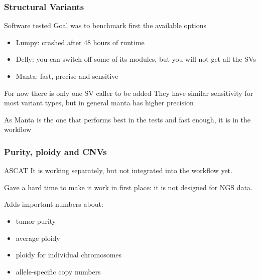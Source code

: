 \documentclass{beamer}
\begin{document}
\begin{frame}
\frametitle{Structural Variants}
	\begin{block}{Software tested}
	Goal was to benchmark first the available options
	\end{block}
	\begin{itemize}		
		\item Lumpy: crashed after 48 hours of runtime 
		\item Delly: you can switch off some of its modules, but you will not get all the SVs
		\item Manta: fast, precise and sensitive
	\end{itemize}
	\begin{block}{For now there is only one SV caller to be added}
	They have similar sensitivity for most variant types, but in general manta has higher precision

	As Manta is the one that performs best in the tests and fast enough, it is in the workflow
	\end{block}
\end{frame}

\begin{frame}
\frametitle{Purity, ploidy and CNVs}
\begin{block}{ASCAT}
	It is working separately, but not integrated into the workflow yet.

	Gave a hard time to make it work in first place: it is not designed for NGS data.
	
	Adds important numbers about:
	\begin{itemize}
		\item tumor purity
		\item average ploidy
		\item ploidy for individual chromosomes
		\item allele-specific copy numbers
	\end{itemize}
\end{block}
\end{frame}
\end{document}
